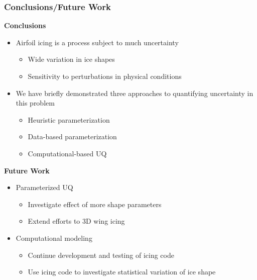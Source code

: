 \documentclass[9pt]{beamer}
\begin{document}
\begin{frame}
\frametitle{Conclusions/Future Work}
\label{sec-5-12}


\textbf{Conclusions}
\begin{itemize}
\item Airfoil icing is a process subject to much uncertainty
\begin{itemize}
\item Wide variation in ice shapes
\item Sensitivity to perturbations in physical conditions
\end{itemize}
\item We have briefly demonstrated three approaches to quantifying
  uncertainty in this problem
\begin{itemize}
\item Heuristic parameterization
\item Data-based parameterization
\item Computational-based UQ
\end{itemize}
\end{itemize}
\textbf{Future Work}
\begin{itemize}
\item Parameterized UQ
\begin{itemize}
\item Investigate effect of more shape parameters
\item Extend efforts to 3D wing icing
\end{itemize}
\item Computational modeling
\begin{itemize}
\item Continue development and testing of icing code
\item Use icing code to investigate statistical variation of ice shape
\end{itemize}
\end{itemize}
\end{frame}
\end{document}
